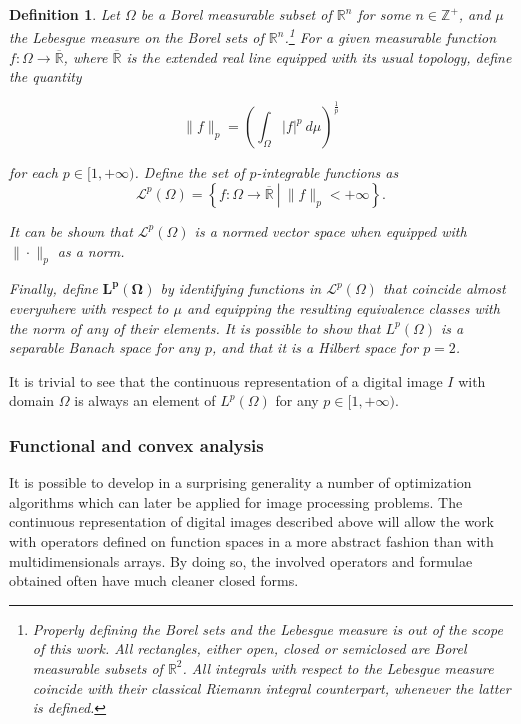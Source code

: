 \documentclass[twocolumn,twoside,a4paper,10pt]{IEEEtran}
\newtheorem{definition}{Definition}
\begin{document}
\begin{definition}
  Let \(\Omega\) be a Borel measurable subset of \(\mathbb{R}^n\) for some \(n\in \mathbb{Z}^+\), and \(\mu\) the Lebesgue measure on the Borel sets of \(\mathbb{R}^n\).\footnote{Properly defining the Borel sets and the Lebesgue measure is out of the scope of this work. All rectangles, either open, closed or semiclosed are Borel measurable subsets of \(\mathbb{R}^2\). All integrals with respect to the Lebesgue measure coincide with their classical Riemann integral counterpart, whenever the latter is defined.} For a given measurable function \(f\colon \Omega\to \overline{\mathbb{R}}\), where \(\overline{\mathbb{R}}\) is the extended real line equipped with its usual topology, define the quantity

  \[
    \|f\|_{p} = \left(\int_{\Omega}|f|^p~d\mu\right)^{\frac 1p}
  \]

  for each \(p\in[1, +\infty)\). Define the set of \(p\)-integrable functions as 
  \[
    \mathcal{L}^p(\Omega) = \left\{f\colon\Omega\to \mathbb{\overline{R}}~\left|~\|f\|_{p}<+\infty\right.\right\}
  .\]

  It can be shown that \(\mathcal{L}^p(\Omega)\) is a normed vector space when equipped with \(\|\cdot\|_{p}\) as a norm.

  Finally, define \(\bm{L^p(\Omega)}\) by identifying functions in \(\mathcal{L}^p(\Omega)\) that coincide almost everywhere with respect to \(\mu\) and equipping the resulting equivalence classes with the norm of any of their elements. It is possible to show that \(L^p(\Omega)\) is a separable Banach space for any \(p\), and that it is a Hilbert space for \(p=2\).
\end{definition}

It is trivial to see that the continuous representation of a digital image \(I\) with domain \(\Omega\) is always an element of \(L^p(\Omega)\) for any \(p\in[1, +\infty)\).

\subsubsection{Functional and convex analysis} It is possible to develop in a surprising generality a number of optimization algorithms which can later be applied for image processing problems. The continuous representation of digital images described above will allow the work with operators defined on function spaces in a more abstract fashion than with multidimensionals arrays. By doing so, the involved operators and formulae obtained often have much cleaner closed forms. 
\end{document}
